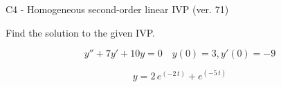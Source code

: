 \begin{exercise}
  \begin{exerciseTitle}C4 - Homogeneous second-order linear IVP (ver. 71)\end{exerciseTitle}
  \begin{exerciseStatement}
    
Find the solution to the given IVP.

    
\[y''+7y'+10y = 0 \hspace{1em} y(0) = 3 , y'(0) = -9\]

  \end{exerciseStatement}
  \begin{exerciseAnswer}
    
\[y= 2 \, e^{\left(-2 \, t\right)} + e^{\left(-5 \, t\right)}\]

  \end{exerciseAnswer}
\end{exercise}